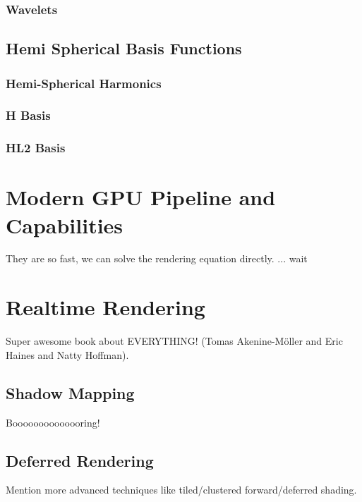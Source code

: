 \documentclass[thesis.tex]{subfiles}
\begin{document}
\subsubsection{Wavelets}

\subsection{Hemi Spherical Basis Functions}
\subsubsection{Hemi-Spherical Harmonics}
\subsubsection{H Basis}
\subsubsection{HL2 Basis}

\section{Modern GPU Pipeline and Capabilities}
They are so fast, we can solve the rendering equation directly. ... wait


\section{Realtime Rendering}
Super awesome book about EVERYTHING! \cite{bib:RealtimeRenderingBook} (Tomas Akenine-M\"{o}ller and Eric Haines and Natty Hoffman).

\subsection{Shadow Mapping}
Boooooooooooooring!

\subsection{Deferred Rendering}
Mention more advanced techniques like tiled/clustered forward/deferred shading.

\subfilebib %
\end{document}
